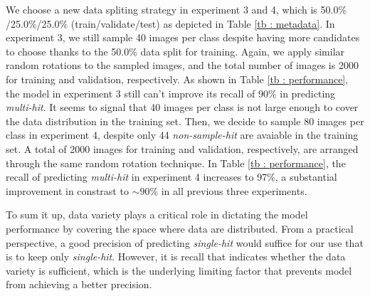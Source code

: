 We choose a new data spliting strategy in experiment 3 and 4, which is 50.0\%
/25.0\%/25.0\% (train/validate/test) as depicted in Table \ref{tb : metadata}.
In experiment 3, we still sample 40 images per class despite having more
candidates to choose thanks to the 50.0\% data split for training.  Again, we
apply similar random rotations to the sampled images, and the total number of
images is 2000 for training and validation, respectively.  As shown in Table
\ref{tb : performance}, the model in experiment 3 still can't improve its recall
of 90\% in predicting \textit{multi-hit}.  It seems to signal that 40 images per
class is not large enough to cover the data distribution in the training set.
Then, we decide to sample 80 images per class in experiment 4, despite only 44
\textit{non-sample-hit} are avaiable in the training set.  A total of 2000
images for training and validation, respectively, are arranged through the same
random rotation technique.  In Table \ref{tb : performance}, the recall of
predicting \textit{multi-hit} in experiment 4 increases to 97\%, a substantial
improvement in constrast to $\sim 90\%$ in all previous three experiments.  

To sum it up, data variety plays a critical role in dictating the model
performance by covering the space where data are distributed.  From a practical
perspective, a good precision of predicting \textit{single-hit} would suffice
for our use that is to keep only \textit{single-hit}.  However, it is recall
that indicates whether the data variety is sufficient, which is the underlying
limiting factor that prevents model from achieving a better precision.  





